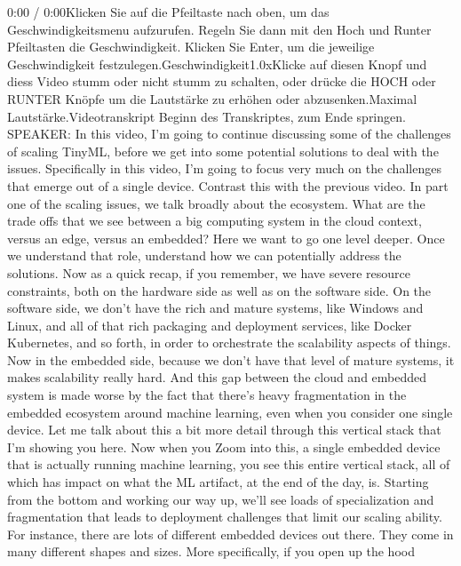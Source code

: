{{{{{     0:00 / 0:00Klicken Sie auf die Pfeiltaste nach oben, um das Geschwindigkeitsmenu aufzurufen. Regeln Sie dann mit den Hoch und Runter Pfeiltasten die Geschwindigkeit. Klicken Sie Enter, um die jeweilige Geschwindigkeit festzulegen.Geschwindigkeit1.0xKlicke auf diesen Knopf und diess Video stumm oder nicht stumm zu schalten, oder drücke die HOCH oder RUNTER Knöpfe um die Lautstärke zu erhöhen oder abzusenken.Maximal Lautstärke.Videotranskript
     Beginn des Transkriptes, zum Ende springen.
     SPEAKER: In this video, I'm going to continue
     discussing some of the challenges of scaling TinyML,
     before we get into some potential solutions to deal with the issues.
     Specifically in this video, I'm going to focus very much on the challenges that
     emerge out of a single device.
     Contrast this with the previous video.
     In part one of the scaling issues, we talk broadly about the ecosystem.
     What are the trade offs that we see between a big computing
     system in the cloud context, versus an edge, versus an embedded?
     Here we want to go one level deeper.
     Once we understand that role, understand how we can potentially
     address the solutions.
     Now as a quick recap, if you remember, we
     have severe resource constraints, both on the hardware side
     as well as on the software side.
     On the software side, we don't have the rich and mature systems, like Windows
     and Linux, and all of that rich packaging and deployment services,
     like Docker Kubernetes, and so forth, in order
     to orchestrate the scalability aspects of things.
     Now in the embedded side, because we don't
     have that level of mature systems, it makes scalability really hard.
     And this gap between the cloud and embedded system
     is made worse by the fact that there's heavy fragmentation
     in the embedded ecosystem around machine learning,
     even when you consider one single device.
     Let me talk about this a bit more detail through this vertical stack
     that I'm showing you here.
     Now when you Zoom into this, a single embedded device that is actually
     running machine learning, you see this entire vertical stack, all of which
     has impact on what the ML artifact, at the end of the day, is.
     Starting from the bottom and working our way up,
     we'll see loads of specialization and fragmentation
     that leads to deployment challenges that limit our scaling ability.
     For instance, there are lots of different embedded devices out there.
     They come in many different shapes and sizes.
     More specifically, if you open up the hood
}}}}}

